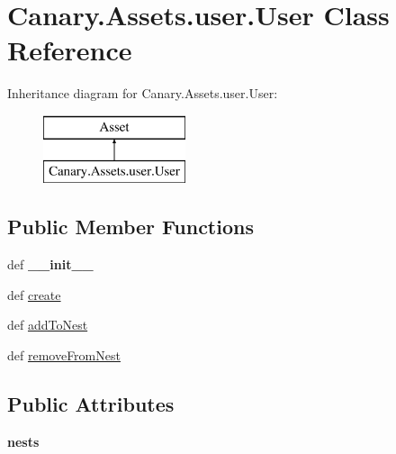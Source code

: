 \hypertarget{class_canary_8_assets_1_1user_1_1_user}{\section{Canary.\-Assets.\-user.\-User Class Reference}
\label{class_canary_8_assets_1_1user_1_1_user}
}
Inheritance diagram for Canary.\-Assets.\-user.\-User\-:\begin{figure}[H]
\begin{center}
\leavevmode
\includegraphics[height=2.000000cm]{class_canary_8_assets_1_1user_1_1_user}
\end{center}
\end{figure}
\subsection*{Public Member Functions}
\begin{DoxyCompactItemize}
\item 
\hypertarget{class_canary_8_assets_1_1user_1_1_user_a69a3cbd8805d3e73f15416facaaeeee3}{def {\bfseries \-\_\-\-\_\-init\-\_\-\-\_\-}}\label{class_canary_8_assets_1_1user_1_1_user_a69a3cbd8805d3e73f15416facaaeeee3}

\item 
def \hyperlink{class_canary_8_assets_1_1user_1_1_user_a703241a2556b7561493df99ec2ecd056}{create}
\item 
def \hyperlink{class_canary_8_assets_1_1user_1_1_user_ad2e6c7fda7e390b15848544bca68f32d}{add\-To\-Nest}
\item 
def \hyperlink{class_canary_8_assets_1_1user_1_1_user_a1a6fe6f88723a6af96097d3032cfeef9}{remove\-From\-Nest}
\end{DoxyCompactItemize}
\subsection*{Public Attributes}
\begin{DoxyCompactItemize}
\item 
\hypertarget{class_canary_8_assets_1_1user_1_1_user_ab6e060a699aa959e6114e80cf824b05b}{{\bfseries nests}}\label{class_canary_8_assets_1_1user_1_1_user_ab6e060a699aa959e6114e80cf824b05b}

\end{DoxyCompactItemize}


